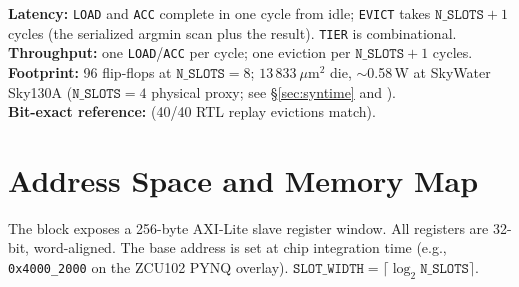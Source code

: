 \documentclass[11pt]{article}
\begin{document}
\medskip
\noindent\textbf{Latency:} \texttt{LOAD} and \texttt{ACC} complete in one cycle
from idle; \texttt{EVICT} takes $\texttt{N\_SLOTS}+1$ cycles (the serialized
argmin scan plus the result). \texttt{TIER} is combinational.\\
\textbf{Throughput:} one \texttt{LOAD}/\texttt{ACC} per cycle; one eviction per
$\texttt{N\_SLOTS}+1$ cycles.\\
\textbf{Footprint:} 96 flip-flops at $\texttt{N\_SLOTS}=8$; $13\,833~\mu$m$^2$
die, $\sim$0.58\,\textmu W at SkyWater Sky130A ($\texttt{N\_SLOTS}=4$ physical
proxy; see \S\ref{sec:syntime} and ).\\
\textbf{Bit-exact reference:}  (40/40 RTL
replay evictions match).

\section{Address Space and Memory Map}
\label{sec:memmap}

The block exposes a 256-byte AXI-Lite slave register window. All registers are
32-bit, word-aligned. The base address is set at chip integration time (e.g.,
\texttt{0x4000\_2000} on the ZCU102 PYNQ overlay). $\texttt{SLOT\_WIDTH} =
\lceil\log_2\texttt{N\_SLOTS}\rceil$.
\end{document}
